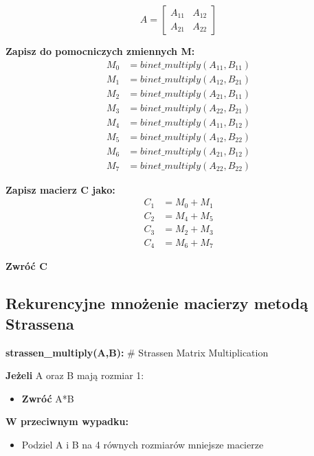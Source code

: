 \documentclass{article}
\begin{document}
        \[
        A = 
        \begin{bmatrix}
            A_{11} & A_{12} \\
            A_{21} & A_{22}
        \end{bmatrix}
        \]

        \textbf{Zapisz do pomocniczych zmiennych M:}
        \begin{align*}
        M_0 & = binet\_multiply(A_{11}, B_{11}) \\
        M_1 & = binet\_multiply(A_{12}, B_{21}) \\
        M_2 & = binet\_multiply(A_{21}, B_{11}) \\
        M_3 & = binet\_multiply(A_{22}, B_{21}) \\
        M_4 & = binet\_multiply(A_{11}, B_{12}) \\
        M_5 & = binet\_multiply(A_{12}, B_{22}) \\
        M_6 & = binet\_multiply(A_{21}, B_{12}) \\
        M_7 & = binet\_multiply(A_{22}, B_{22})
        \end{align*}

        \textbf{Zapisz macierz C jako:}
        \begin{align*}
        C_1 & = M_0 + M_1 \\
        C_2 & = M_4 + M_5 \\
        C_3 & = M_2 + M_3 \\
        C_4 & = M_6 + M_7
        \end{align*}

        \textbf{Zwróć C}

    \subsection{Rekurencyjne mnożenie macierzy metodą Strassena}
        \textbf{strassen\_multiply(A,B):} \hfill \# Strassen Matrix Multiplication

        \textbf{Jeżeli} A oraz B mają rozmiar 1:
        \begin{itemize}
            \item \textbf{Zwróć} A*B
        \end{itemize}
        
        \textbf{W przeciwnym wypadku:}
        \begin{itemize}
            \item Podziel A i B na 4 równych rozmiarów mniejsze macierze
        \end{itemize}
        
\end{document}

